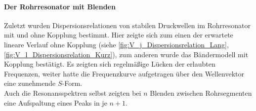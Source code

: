 \documentclass[../main.tex]{subfiles}
\begin{document}
\paragraph{Der Rohrresonator mit Blenden}
    Zuletzt wurden Dispersionsrelationen von stabilen Druckwellen im Rohrresonator mit und ohne Kopplung bestimmt. Hier zeigte sich zum einen der erwartete lineare Verlauf ohne Kopplung (siehe \ref{fig:V_j_Dispersionsrelation_Lang}, \ref{fig:V_l_Dispersionsrelation_Kurz}), zum anderen wurde das Bändermodell mit Kopplung bestätigt. Es zeigten sich regelmäßige Lücken der erlaubten Frequenzen, weiter hatte die Frequenzkurve aufgetragen über den Wellenvektor eine zunehmende $S$-Form.\\

    Auch die Resonansspektren selbst zeigten bei $n$ Blenden zwischen Rohrsegmenten eine Aufspaltung eines Peaks in je $n+1$.
\end{document}
